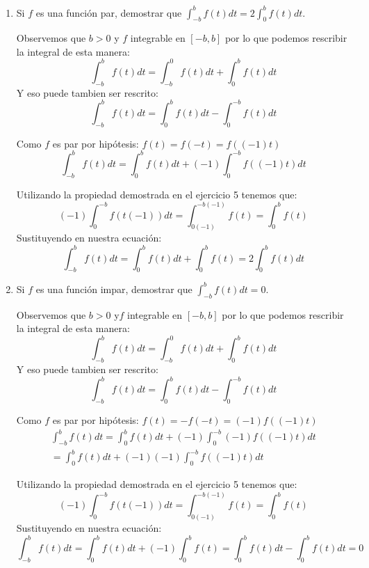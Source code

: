 \documentclass[12pt]{article}
\begin{document}
\begin{enumerate}[\hspace{9px} a)]
    \item Si $f$ es una funci\'on par, demostrar que \(\displaystyle\int_{-b}^{b}f(t)dt=2\int_{0}^{b}f(t)dt\).\medskip
    
    Observemos que \(b > 0\) y \(f\) integrable en \([-b, b]\) por lo que podemos rescribir la integral de esta manera:
    \[\int_{-b}^{b}f(t)dt = \int_{-b}^{0}f(t)dt + \int_{0}^{b}f(t)dt\]
    Y eso puede tambien ser rescrito: 
    \[\int_{-b}^{b}f(t)dt = \int_{0}^{b}f(t)dt - \int_{0}^{-b}f(t)dt\]

    Como $f$ es par por hip\'otesis: \(f(t) = f(-t) = f((-1)t)\)\medskip
    \[\int_{-b}^{b}f(t)dt = \int_{0}^{b}f(t)dt + (-1)\int_{0}^{-b}f((-1)t)dt\]
    
    Utilizando la propiedad demostrada en el ejercicio 5 tenemos que:
    \begin{equation*}
        (-1)\int_{0}^{-b}f(t(-1))dt = \int_{0(-1)}^{-b(-1)}f(t) = \int_{0}^{b}f(t)
    \end{equation*}
    Sustituyendo en nuestra ecuaci\'on:
    \[\int_{-b}^{b}f(t)dt = \int_{0}^{b}f(t)dt + \int_{0}^{b}f(t) = 2\int_{0}^{b}f(t)dt\]
    
    \item Si $f$ es una funci\'on impar, demostrar que \(\displaystyle\int_{-b}^{b}f(t)dt=0\).\medskip
    
    Observemos que \(b>0\) y\(f\) integrable en \([-b,b]\) por lo que podemos rescribir la integral de esta manera:
    \[\displaystyle\int_{-b}^{b}f(t)dt = \displaystyle\int_{-b}^{0}f(t)dt+\displaystyle\int_{0}^{b}f(t)dt\]
    Y eso puede tambien ser rescrito:
    \[\int_{-b}^{b}f(t)dt=\int_{0}^{b}f(t)dt - \displaystyle\int_{0}^{-b}f(t)dt\]

    Como $f$ es par por hip\'otesis: \(f(t) = -f(-t) = (-1)f((-1)t)\)\medskip
    \begin{multline*}
        \int_{-b}^{b}f(t)dt = \int_{0}^{b}f(t)dt + (-1)\int_{0}^{-b}(-1)f((-1)t)dt\\ = \int_{0}^{b}f(t)dt + (-1)(-1)\int_{0}^{-b}f((-1)t)dt
    \end{multline*}
    
    Utilizando la propiedad demostrada en el ejercicio 5 tenemos que:
    \begin{equation*}
        (-1)\int_{0}^{-b}f(t(-1))dt = \int_{0(-1)}^{-b(-1)}f(t) = \int_{0}^{b}f(t)
    \end{equation*}
    Sustituyendo en nuestra ecuaci\'on:
    \[\int_{-b}^{b}f(t)dt = \int_{0}^{b}f(t)dt + (-1)\int_{0}^{b}f(t) = \int_{0}^{b}f(t)dt - \int_{0}^{b}f(t)dt = 0\]

\end{enumerate}
\end{document}
